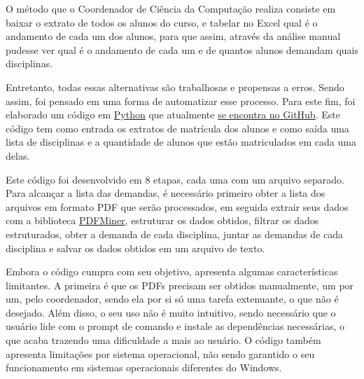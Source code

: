         O método que o Coordenador de Ciência da Computação realiza consiste em baixar o extrato de todos os alunos do curso, e tabelar no Excel qual é o andamento de cada um dos alunos, para que assim, através da análise manual pudesse ver qual é o andamento de cada um e de quantos alunos demandam quais disciplinas.

        Entretanto, todas essas alternativas são trabalhosas e propensas a erros. Sendo assim, foi pensado em uma forma de automatizar esse processo. Para este fim, foi elaborado um código em \href{https://www.python.org/}{Python} que atualmente \href{https://github.com/jvfd3/university_demand}{se encontra no GitHub}. Este código tem como entrada os extratos de matrícula dos alunos e como saída uma lista de disciplinas e a quantidade de alunos que estão matriculados em cada uma delas.


        Este código foi desenvolvido em 8 etapas, cada uma com um arquivo separado. Para alcançar a lista das demandas, é necessário primeiro obter a lista dos arquivos em formato PDF que serão processados, em seguida extrair seus dados com a biblioteca \href{https://pypi.org/project/pdfminer/}{PDFMiner}, estruturar os dados obtidos, filtrar os dados estruturados, obter a demanda de cada disciplina, juntar as demandas de cada disciplina e salvar os dados obtidos em um arquivo de texto.

        Embora o código cumpra com seu objetivo, apresenta algumas características limitantes. A primeira é que os PDFs precisam ser obtidos manualmente, um por um, pelo coordenador, sendo ela por si só uma tarefa extenuante, o que não é desejado. Além disso, o seu uso não é muito intuitivo, sendo necessário que o usuário lide com o prompt de comando e instale as dependências necessárias, o que acaba trazendo uma dificuldade a mais ao usuário. O código também apresenta limitações por sistema operacional, não sendo garantido o seu funcionamento em sistemas operacionais diferentes do Windows.

